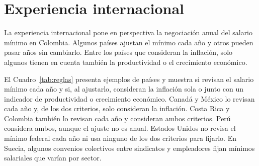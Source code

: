 \section{Experiencia internacional}
\label{sec:experiencia-internacional}


La experiencia internacional pone en perspectiva la negociación anual del salario mínimo en Colombia. Algunos países ajustan el mínimo cada año y otros pueden pasar años sin cambiarlo. Entre los países que consideran la inflación, solo algunos tienen en cuenta también la productividad o el crecimiento económico.

El Cuadro~\ref{tab:reglas} presenta ejemplos de países y muestra si revisan el salario mínimo cada año y si, al ajustarlo, consideran la inflación sola o junto con un indicador de productividad o crecimiento económico. Canadá y México lo revisan cada año y, de los dos criterios, solo consideran la inflación. Costa Rica y Colombia también lo revisan cada año y consideran ambos criterios. Perú considera ambos, aunque el ajuste no es anual. Estados Unidos no revisa el mínimo federal cada año ni usa ninguno de los dos criterios para fijarlo. En Suecia, algunos convenios colectivos entre sindicatos y empleadores fijan mínimos salariales que varían por sector.

